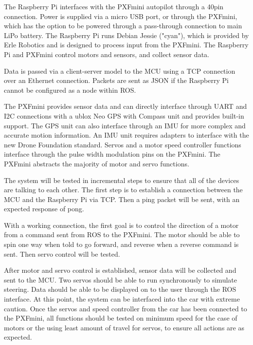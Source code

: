 \documentclass[compsoc,draftclsnofoot,onecolumn,10pt]{IEEEtran}
\begin{document}
The Raspberry Pi interfaces with the PXFmini autopilot through a 40pin connection. Power is supplied via a micro USB port, or through the PXFmini, which has the option to be powered through a pass-through connection to main LiPo battery. The Raspberry Pi runs Debian Jessie ("cyan"), which is provided by Erle Robotics and is designed to process input from the PXFmini. The Raspberry Pi and PXFmini control motors and sensors, and collect sensor data. \par

Data is passed via a client-server model to the MCU using a TCP connection over an Ethernet connection. Packets are sent as JSON if the Raspberry Pi cannot be configured as a node within ROS. \par

The PXFmini provides sensor data and can directly interface through UART and I2C connections with a ublox Neo GPS with Compass unit and provides built-in support. The GPS unit can also interface through an IMU for more complex and accurate motion information. An IMU unit requires adapters to interface with the new Drone Foundation standard. 
Servos and a motor speed controller functions interface through the pulse width modulation pins on the PXFmini. The PXFmini abstracts the majority of motor and servo functions. \par

The system will be tested in incremental steps to ensure that all of the devices are talking to each other. 
The first step is to establish a connection between the MCU and the Raspberry Pi via TCP. Then a ping packet will be sent, with an expected response of pong. \par
With a working connection, the first goal is to control the direction of a motor from a command sent from ROS to the PXFmini. The motor should be able to spin one way when told to go forward, and reverse when a  reverse command is sent. Then servo control will be tested. \par
After motor and servo control is established, sensor data will be collected and sent to the MCU. Two servos should be able to run synchronously to simulate steering. Data should be able to be displayed on to the user through the ROS interface. 
At this point, the system can be interfaced into the car with extreme caution. Once the servos and speed controller from the car has been connected to the PXFmini, all functions should be tested on minimum speed for the case of motors or the using least amount of travel for servos, to ensure all actions are as expected. \par
\end{document}
